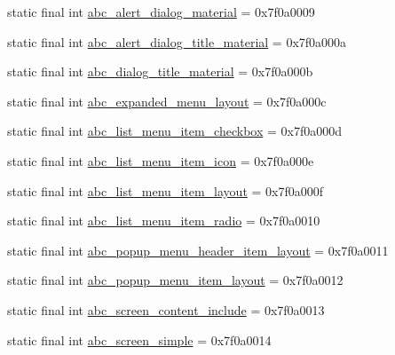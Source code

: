 \begin{DoxyCompactItemize}
\item 
static final int \mbox{\hyperlink{classandroid_1_1support_1_1design_1_1_r_1_1layout_ae345cc83bdcd7ddfdbf543e4483b9515}{abc\+\_\+alert\+\_\+dialog\+\_\+material}} = 0x7f0a0009
\item 
static final int \mbox{\hyperlink{classandroid_1_1support_1_1design_1_1_r_1_1layout_a9d032e94c381c333b51249cb57fa18d3}{abc\+\_\+alert\+\_\+dialog\+\_\+title\+\_\+material}} = 0x7f0a000a
\item 
static final int \mbox{\hyperlink{classandroid_1_1support_1_1design_1_1_r_1_1layout_ab98202b6d43ce7854889d44c825908af}{abc\+\_\+dialog\+\_\+title\+\_\+material}} = 0x7f0a000b
\item 
static final int \mbox{\hyperlink{classandroid_1_1support_1_1design_1_1_r_1_1layout_a8dd1e24e585a6ed15385c5fa7a9a543b}{abc\+\_\+expanded\+\_\+menu\+\_\+layout}} = 0x7f0a000c
\item 
static final int \mbox{\hyperlink{classandroid_1_1support_1_1design_1_1_r_1_1layout_a2c90f63e9a8c8b2e68269eae863ae97d}{abc\+\_\+list\+\_\+menu\+\_\+item\+\_\+checkbox}} = 0x7f0a000d
\item 
static final int \mbox{\hyperlink{classandroid_1_1support_1_1design_1_1_r_1_1layout_aaa44eb526bc60350d6aaf3be20618c64}{abc\+\_\+list\+\_\+menu\+\_\+item\+\_\+icon}} = 0x7f0a000e
\item 
static final int \mbox{\hyperlink{classandroid_1_1support_1_1design_1_1_r_1_1layout_a7558278a1602fc132cb8a9c6017b5a09}{abc\+\_\+list\+\_\+menu\+\_\+item\+\_\+layout}} = 0x7f0a000f
\item 
static final int \mbox{\hyperlink{classandroid_1_1support_1_1design_1_1_r_1_1layout_abeaea14dea4b8b1164cc05e47ab8dde2}{abc\+\_\+list\+\_\+menu\+\_\+item\+\_\+radio}} = 0x7f0a0010
\item 
static final int \mbox{\hyperlink{classandroid_1_1support_1_1design_1_1_r_1_1layout_a159a8f906f55f633afac9ad37ffc86c8}{abc\+\_\+popup\+\_\+menu\+\_\+header\+\_\+item\+\_\+layout}} = 0x7f0a0011
\item 
static final int \mbox{\hyperlink{classandroid_1_1support_1_1design_1_1_r_1_1layout_a96f5a59e279f130e091777270663f7a3}{abc\+\_\+popup\+\_\+menu\+\_\+item\+\_\+layout}} = 0x7f0a0012
\item 
static final int \mbox{\hyperlink{classandroid_1_1support_1_1design_1_1_r_1_1layout_ac1ea0700228284eac706a3d1369d7fab}{abc\+\_\+screen\+\_\+content\+\_\+include}} = 0x7f0a0013
\item 
static final int \mbox{\hyperlink{classandroid_1_1support_1_1design_1_1_r_1_1layout_a957aec20303a776f195a00390496753b}{abc\+\_\+screen\+\_\+simple}} = 0x7f0a0014

\end{DoxyCompactItemize}
